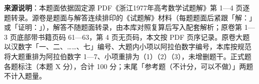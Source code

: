 


\begin{gktip}
\textbf{来源说明}：本题面依据固定源 PDF《浙江1977年高考数学试题解》第 1—4 页逐题转录。源卷是题面与解答连续排印的《试题解》材料（每题题面后紧跟「解：」或「证明：」），解答不随题面转录，由本库对照复算后写入配套解析；原卷第 1—3 页底部带书籍页码 61—63，第 4 页无页码，本文按 PDF 页序记录。原卷大题以汉数字「一、二、……、七」编号、大题内小项以阿拉伯数字编号，本库按规范将大题重排为阿拉伯数字 1—7、小项重排为（1）（2）（3），未增删题干。正式题各题标注（本题 X 分），合计 100 分；末尾「参考题（不计分，可以不做）」两题不计入题量。
\end{gktip}

\par\medskip

